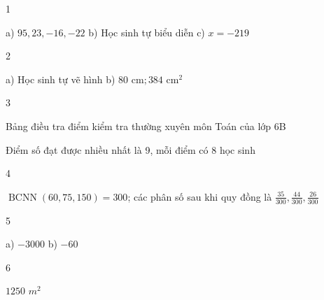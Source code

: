 \begin{Solbook}{1}
 \par \noindent a) $95, 23, -16, -22$ \hfill b) Học sinh tự biểu diễn \hfill c) $x = -219$ \hfill \qedEX 
\end{Solbook}
\begin{Solbook}{2}
 \par \noindent a) Học sinh tự vẽ hình \hfill b) $80 \text { cm}; 384 \text { cm}^2$ \hfill \qedEX 
\end{Solbook}
\begin{Solbook}{3}
 \par \noindent \begin {listEX} \item Bảng điều tra điểm kiểm tra thường xuyên môn Toán của lớp 6B \item Điểm số đạt được nhiều nhất là 9, mỗi điểm có 8 học sinh \end {listEX} \hfill \qedEX 
\end{Solbook}
\begin{Solbook}{4}
 \par \noindent $\operatorname {BCNN}(60, 75, 150) = 300$; các phân số sau khi quy đồng là $\frac {35}{300}, \frac {44}{300}, \frac {26}{300}$ \hfill \qedEX 
\end{Solbook}
\begin{Solbook}{5}
 \par \noindent a) $-3000$ \hfill b) $-60$  \hfill \qedEX 
\end{Solbook}
\begin{Solbook}{6}
 \par \noindent $1250$ $m^2$ \hfill \qedEX 
\end{Solbook}
